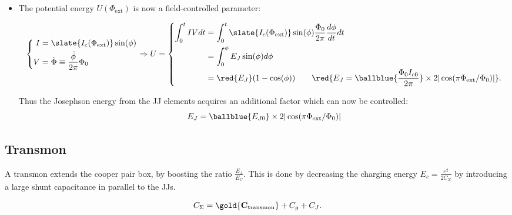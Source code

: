 \begin{itemize}
\begin{framed}
\end{framed}

\item The potential energy $U(\Phi_{\text{ext}})$ is now a field-controlled parameter:

  \begin{equation}
    \left\{\begin{aligned}
        I &= \slate{I_c(\Phi_\text{ext})}\sin(\phi)\\
        V&=\dot{\Phi} \equiv \frac{\dot{\phi}}{2\pi}\Phi_0
      \end{aligned}\right.  \Rightarrow U =
    \left\{
      \begin{aligned}
        \int_{0}^{t}IV dt & = \int_{0}^{t}\slate{I_c(\Phi_\text{ext})}\sin(\phi)\frac{\Phi_0}{2\pi}\frac{d\phi}{dt}dt\\
        & = \int_{0}^{\phi} E_J\sin(\phi)d\phi\\
        &      =      \red{E_J}(1-\cos(\phi))      \qquad       \red{E_J      =      \ballblue{\frac{\Phi_0I_{c0}}{2\pi}}      \times
          2|\cos(\pi\Phi_\text{ext}/\Phi_0)|}.
      \end{aligned}\right.
  \end{equation}
  \begin{framed}\noindent
    Thus the Josephson energy from the JJ elements acquires an additional factor which can now be controlled:
    \begin{equation}
      E_J = \ballblue{E_{J0}} \times 2|\cos(\pi\Phi_\text{ext}/\Phi_0)|
    \end{equation}
  \end{framed}
\end{itemize}

\subsection{Transmon}
\label{sec:transmon}

A transmon extends  the cooper pair box,  by boosting the ratio  $\frac{E_{J}}{E_{C}}$.  This is done  by decreasing the
charging energy $E_c= \frac{e^2}{2C_\Sigma}$ by introducing a large shunt capacitance in parallel to the JJs.

\begin{framed}\noindent
  \begin{equation}
    C_{\Sigma} =  \gold{\mathbf{C_\text{transmon}}} + C_g  + C_J.
  \end{equation}
\end{framed}

